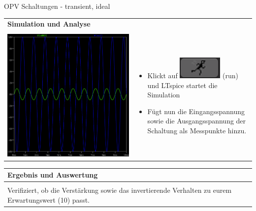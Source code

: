 \begin{frame}[t]{OPV Schaltungen - transient, ideal}
\begin{spacing}{0.9}
\begin{tiny}
\begin{table}[h!]
\begin{tabular}{p{4cm} p{6cm}}
                                                & \\
          \hline
          \textbf{Simulation und Analyse}       & \\
          \hline                                  \\
          \begin{minipage}{.5\textwidth}
            \includegraphics[width=0.5\linewidth]{pictures/analysis_5.png}
          \end{minipage}
                                                &
          \begin{minipage}{.5\textwidth}
            \begin{itemize}
              \item Klickt auf \includegraphics[scale=0.3]{pictures/run.png} (run) und LTspice startet die Simulation
              \item Fügt nun die Eingangsspannung sowie die Ausgangsspannung der Schaltung als Messpunkte hinzu.
            \end{itemize}
          \end{minipage}
          \\
        \end{tabular}
      \end{table}
    \end{tiny} \end{spacing}

  \begin{spacing}{0.9} \begin{tiny}
      \begin{table}[h!]
        \begin{tabular}{p{10cm} }
          \hline
          \textbf{Ergebnis und Auswertung} \\
          \hline                           \\
          Verifiziert, ob die Verstärkung sowie das invertierende Verhalten zu eurem Erwartungswert (10) passt.
        \end{tabular}
      \end{table}
    \end{tiny} \end{spacing}

\end{frame}


